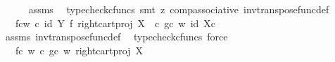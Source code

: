 \begin{isabellebody}
\ \ \ \ \isamarkupfalse%
\ assms\ \isamarkupfalse%
\ {\isacharparenleft}{\kern0pt}typecheck{\isacharunderscore}{\kern0pt}cfuncs{\isacharcomma}{\kern0pt}\ smt\ {\isacharparenleft}{\kern0pt}z{}{\isacharparenright}{\kern0pt}\ comp{\isacharunderscore}{\kern0pt}associative{}\ inv{\isacharunderscore}{\kern0pt}transpose{\isacharunderscore}{\kern0pt}func{\isacharunderscore}{\kern0pt}def{}{\isacharparenright}{\kern0pt}\isanewline
\ \ \isamarkupfalse%
\ \isamarkupfalse%
\ {\isachardoublequoteopen}{\isachardot}{\kern0pt}{\isachardot}{\kern0pt}{\isachardot}{\kern0pt}\ {\isacharequal}{\kern0pt}\ {\isacharparenleft}{\kern0pt}{\isacharparenleft}{\kern0pt}f{\isasymcirc}\isactrlsub cw{\isacharparenright}{\kern0pt}\isactrlsup {\isasymflat}\ {\isasymcirc}\isactrlsub c\ {\isacharparenleft}{\kern0pt}id\ {\isacharparenleft}{\kern0pt}Y{\isacharparenright}{\kern0pt}\ {\isasymtimes}\isactrlsub f\ right{\isacharunderscore}{\kern0pt}cart{\isacharunderscore}{\kern0pt}proj\ X\ {\isasymone}{\isacharparenright}{\kern0pt}\ {\isasymcirc}\isactrlsub c\ {\isasymlangle}{\isacharparenleft}{\kern0pt}g{\isasymcirc}\isactrlsub c\ w{\isacharparenright}{\kern0pt}\isactrlsup {\isasymflat}{\isacharcomma}{\kern0pt}\ id\ {\isacharparenleft}{\kern0pt}X{\isasymtimes}\isactrlsub c\ {\isasymone}{\isacharparenright}{\kern0pt}{\isasymrangle}{\isacharparenright}{\kern0pt}\isactrlsup {\isasymsharp}{\isachardoublequoteclose}\isanewline
\ \ \ \ \isamarkupfalse%
\ assms\ inv{\isacharunderscore}{\kern0pt}transpose{\isacharunderscore}{\kern0pt}func{\isacharunderscore}{\kern0pt}def{}\ \isamarkupfalse%
\ {\isacharparenleft}{\kern0pt}typecheck{\isacharunderscore}{\kern0pt}cfuncs{\isacharcomma}{\kern0pt}\ force{\isacharparenright}{\kern0pt}\isanewline
\ \ \isamarkupfalse%
\ \isamarkupfalse%
\ {\isachardoublequoteopen}{\isachardot}{\kern0pt}{\isachardot}{\kern0pt}{\isachardot}{\kern0pt}\ {\isacharequal}{\kern0pt}\ {\isacharparenleft}{\kern0pt}{\isacharparenleft}{\kern0pt}f{\isasymcirc}\isactrlsub c\ w{\isacharparenright}{\kern0pt}\isactrlsup {\isasymflat}\ {\isasymcirc}\isactrlsub c\ {\isasymlangle}{\isacharparenleft}{\kern0pt}g{\isasymcirc}\isactrlsub c\ w{\isacharparenright}{\kern0pt}\isactrlsup {\isasymflat}{\isacharcomma}{\kern0pt}\ right{\isacharunderscore}{\kern0pt}cart{\isacharunderscore}{\kern0pt}proj\ X\ {\isasymone}{\isasymrangle}{\isacharparenright}{\kern0pt}\isactrlsup {\isasymsharp}{\isachardoublequoteclose}\isanewline
\ \ \ \ \isamarkupfalse%

\end{isabellebody}
